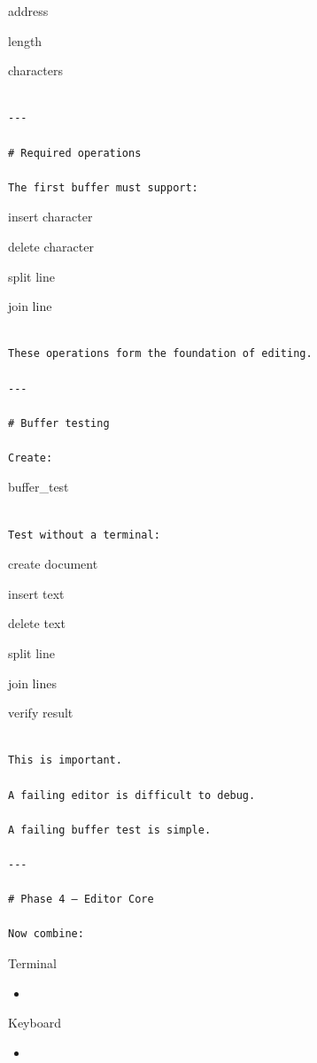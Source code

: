 \documentclass[
  oneside,
  openany]{book}
\providecommand{\tightlist}{%
  \setlength{\itemsep}{0pt}\setlength{\parskip}{0pt}}
\begin{document}
address

length

characters

\begin{verbatim}

---

# Required operations

The first buffer must support:
\end{verbatim}

insert character

delete character

split line

join line

\begin{verbatim}

These operations form the foundation of editing.

---

# Buffer testing

Create:
\end{verbatim}

buffer\_test

\begin{verbatim}

Test without a terminal:
\end{verbatim}

create document

insert text

delete text

split line

join lines

verify result

\begin{verbatim}

This is important.

A failing editor is difficult to debug.

A failing buffer test is simple.

---

# Phase 4 — Editor Core

Now combine:
\end{verbatim}

Terminal

\begin{itemize}
\tightlist
\item
\end{itemize}

Keyboard

\begin{itemize}
\tightlist
\item
\end{itemize}
\end{document}
